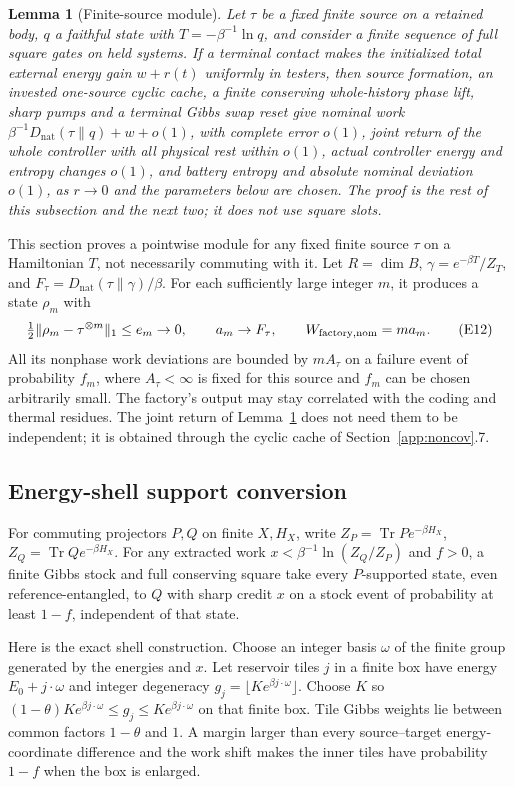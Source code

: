 \documentclass[11pt]{article}
\newtheorem{lemma}[theorem]{Lemma}
\theoremstyle{definition}
\theoremstyle{remark}
\newcommand{\Tr}{\operatorname{Tr}}
\providecommand{\D}{D_{\mathrm{nat}}}
\begin{document}
\begin{lemma}[Finite-source module]\label{lem:module}
Let $\tau$ be a fixed finite source on a retained body, $q$ a faithful state with $T=-\beta^{-1}\ln q$, and consider a finite sequence of full square gates on held systems. If a terminal contact makes the initialized total external energy gain $w+r(t)$ uniformly in testers, then source formation, an invested one-source cyclic cache, a finite conserving whole-history phase lift, sharp pumps and a terminal Gibbs swap reset give nominal work $\beta^{-1}\D(\tau\|q)+w+o(1)$, with complete error $o(1)$, joint return of the whole controller with all physical rest within $o(1)$, actual controller energy and entropy changes $o(1)$, and battery entropy and absolute nominal deviation $o(1)$, as $r\to0$ and the parameters below are chosen. The proof is the rest of this subsection and the next two; it does not use square slots.
\end{lemma}
This section proves a pointwise module for any fixed finite source
\(\tau\) on a Hamiltonian \(T\), not necessarily commuting with it.
Let \(R=\dim B\), \(\gamma=e^{-\beta T}/Z_T\), and
\(F_\tau=\D(\tau\|\gamma)/\beta\). For each sufficiently large integer
\(m\), it produces a state \(\rho_m\) with
\[
 \tfrac12\|\rho_m-\tau^{\otimes m}\|_1\le e_m\to0,\qquad
 a_m\to F_\tau,\qquad W_{\rm factory,nom}=ma_m.       \tag{E12}
\]
All its nonphase work deviations are bounded by \(mA_\tau\) on a
failure event of probability \(f_m\), where \(A_\tau<\infty\) is fixed
for this source and \(f_m\) can be chosen arbitrarily small.
The factory's output may stay correlated with the coding and thermal
residues. The joint return of Lemma~\ref{lem:module} does not need them to be
independent; it is obtained through the cyclic cache of Section~\ref{app:noncov}.7.

\subsection*{Energy-shell support conversion}
For commuting projectors \(P,Q\) on finite \(X,H_X\), write
\(Z_P=\Tr Pe^{-\beta H_X}\), \(Z_Q=\Tr Qe^{-\beta H_X}\).
For any extracted work \(x<\beta^{-1}\ln(Z_Q/Z_P)\) and \(f>0\),
a finite Gibbs stock and full conserving square take every \(P\)-supported
state, even reference-entangled, to \(Q\) with sharp credit \(x\) on a
stock event of probability at least \(1-f\), independent of that state.

Here is the exact shell construction. Choose an integer basis
\(\omega\) of the finite group generated by the energies and \(x\).
Let reservoir tiles \(j\) in a finite box have energy
\(E_0+j\cdot\omega\) and integer degeneracy
\(g_j=\lfloor K e^{\beta j\cdot\omega}\rfloor\).
Choose \(K\) so
\((1-\theta)K e^{\beta j\cdot\omega}\le g_j\le
K e^{\beta j\cdot\omega}\) on that finite box.
Tile Gibbs weights lie between common factors \(1-\theta\) and \(1\).
A margin larger than every source--target energy-coordinate difference
and the work shift makes the inner tiles have probability \(1-f\)
when the box is enlarged.
\end{document}
